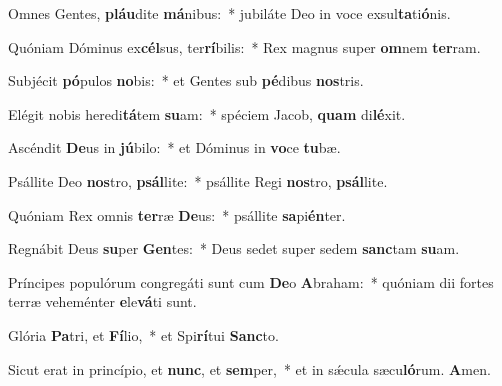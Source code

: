 \item Omnes Gentes, \textbf{pláu}dite \textbf{má}nibus:~* jubiláte Deo in voce exsul\textbf{ta}ti\textbf{ó}nis.
\item Quóniam Dóminus ex\textbf{cél}sus, ter\textbf{rí}bilis:~* Rex magnus super \textbf{om}nem \textbf{ter}ram.
\item Subjécit \textbf{pó}pulos \textbf{no}bis:~* et Gentes sub \textbf{pé}dibus \textbf{nos}tris.
\item Elégit nobis heredi\textbf{tá}tem \textbf{su}am:~* spéciem Jacob, \textbf{quam} di\textbf{lé}xit.
\item Ascéndit \textbf{De}us in \textbf{jú}bilo:~* et Dóminus in \textbf{vo}ce \textbf{tu}bæ.
\item Psállite Deo \textbf{nos}tro, \textbf{psál}lite:~* psállite Regi \textbf{nos}tro, \textbf{psál}lite.
\item Quóniam Rex omnis \textbf{ter}ræ \textbf{De}us:~* psállite \textbf{sa}pi\textbf{én}ter.
\item Regnábit Deus \textbf{su}per \textbf{Gen}tes:~* Deus sedet super sedem \textbf{sanc}tam \textbf{su}am.
\item Príncipes populórum congregáti sunt cum \textbf{De}o \textbf{A}braham:~* quóniam dii fortes terræ veheménter \textbf{e}le\textbf{vá}ti sunt.
\item Glória \textbf{Pa}tri, et \textbf{Fí}lio,~* et Spi\textbf{rí}tui \textbf{Sanc}to.
\item Sicut erat in princípio, et \textbf{nunc}, et \textbf{sem}per,~* et in sǽcula sæcu\textbf{ló}rum. \textbf{A}men.
